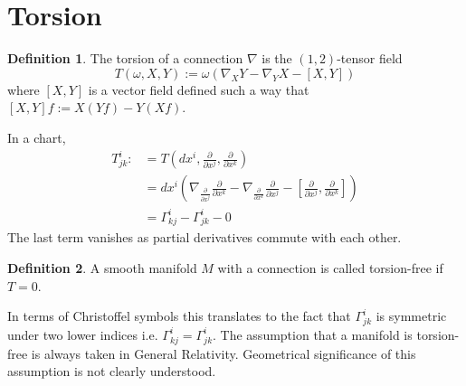 \documentclass[a4paper]{report}
\theoremstyle{definition}
\newtheorem{definition}{Definition}[section]
\theoremstyle{remark}
\begin{document}
	\section{Torsion}
		\begin{definition}
			The torsion of a connection $\nabla$ is the $(1,2)$-tensor field
			\begin{equation*}
				T(\omega,X,Y) := \omega\left(\nabla_{X}Y - \nabla_YX - [X,Y]\right)
			\end{equation*}
			where $[X,Y]$ is a vector field defined such a way that $[X,Y]f := X(Yf) - Y(Xf)$.
		\end{definition}
		In a chart,
		\begin{equation*}
			\begin{split}
				T_{jk}^{i} :&= T\left(dx^i,\tfrac{\partial}{\partial x^j},\tfrac{\partial}{\partial x^k}\right) \\
				&= dx^i\left(\nabla_{\tfrac{\partial}{\partial x^j}}\tfrac{\partial}{\partial x^k} - \nabla_{\tfrac{\partial}{\partial x^k}}\tfrac{\partial}{\partial x^j} - \left[\tfrac{\partial}{\partial x^j},\tfrac{\partial}{\partial x^k}\right]\right) \\
				&= \Gamma_{kj}^{i} - \Gamma_{jk}^{i} - 0
			\end{split}
		\end{equation*}
		The last term vanishes as partial derivatives commute with each other. 
		\begin{definition}
			A smooth manifold $M$ with a connection is called torsion-free if $T = 0$.
		\end{definition}
		In terms of Christoffel symbols this translates to the fact that $\Gamma_{jk}^{i}$ is symmetric under two lower indices i.e. $\Gamma_{kj}^{i} = \Gamma_{jk}^{i}$. The assumption that a manifold is torsion-free is always taken in General Relativity. Geometrical significance of this assumption is not clearly understood.
\end{document}
